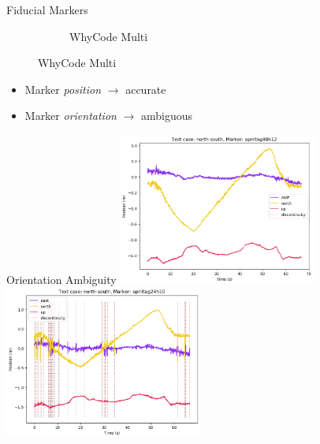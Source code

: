 \documentclass[aspectratio=169]{beamer}
\newif\ifpause
\newcommand{\mypause}{\ifpause \pause \fi}
\begin{document}
\begin{frame}{Fiducial Markers}
\begin{figure}[]
\begin{subfigure}[b]{0.23\linewidth}
		    \caption{WhyCode Multi~\cite{fiducial_precursor_evaluation}}
		\label{figure:whycode_bundle}
	    \end{subfigure}
	    \label{figure:marker_setup}
	\end{figure}
	\mypause
	\begin{itemize}
		\item Marker \emph{position} $\rightarrow$ accurate
		\item Marker \emph{orientation} $\rightarrow$ ambiguous
	\end{itemize}
	\vspace*{\fill}
\end{frame}

\begin{frame}{Orientation Ambiguity}
	\centering
	\vspace{\fill}
	\includegraphics[width=6.5cm]{./images/north-south_apriltag48h12}\mypause
	\includegraphics[width=6.5cm]{./images/north-south_apriltag24h10}
	\vspace{\fill}
\end{frame}
\end{document}
